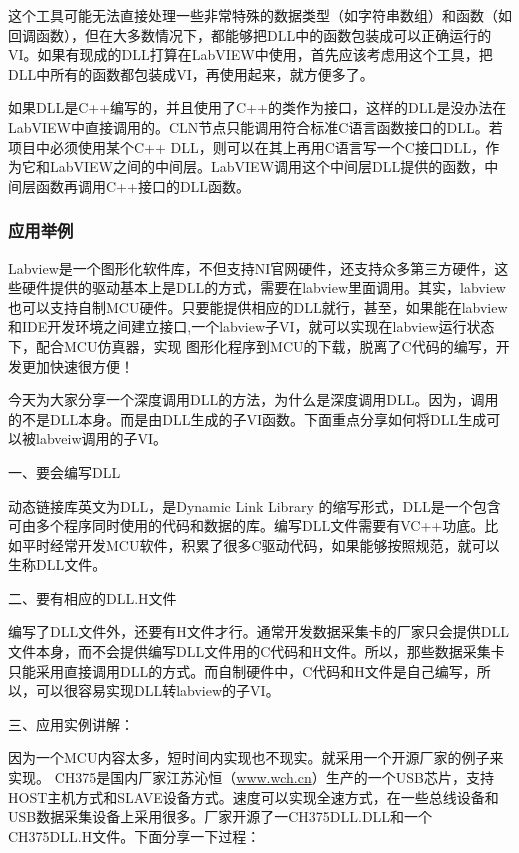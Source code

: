 这个工具可能无法直接处理一些非常特殊的数据类型（如字符串数组）和函数（如回调函数），但在大多数情况下，都能够把DLL中的函数包装成可以正确运行的VI。如果有现成的DLL打算在LabVIEW中使用，首先应该考虑用这个工具，把DLL中所有的函数都包装成VI，再使用起来，就方便多了。

如果DLL是C++编写的，并且使用了C++的类作为接口，这样的DLL是没办法在LabVIEW中直接调用的。CLN节点只能调用符合标准C语言函数接口的DLL。若项目中必须使用某个C++ DLL，则可以在其上再用C语言写一个C接口DLL，作为它和LabVIEW之间的中间层。LabVIEW调用这个中间层DLL提供的函数，中间层函数再调用C++接口的DLL函数。



\subsubsection{应用举例}
Labview是一个图形化软件库，不但支持NI官网硬件，还支持众多第三方硬件，这些硬件提供的驱动基本上是DLL的方式，需要在labview里面调用。其实，labview也可以支持自制MCU硬件。只要能提供相应的DLL就行，甚至，如果能在labview和IDE开发环境之间建立接口,一个labview子VI，就可以实现在labview运行状态下，配合MCU仿真器，实现  图形化程序到MCU的下载，脱离了C代码的编写，开发更加快速很方便！

     今天为大家分享一个深度调用DLL的方法，为什么是深度调用DLL。因为，调用的不是DLL本身。而是由DLL生成的子VI函数。下面重点分享如何将DLL生成可以被labveiw调用的子VI。


一、要会编写DLL

     动态链接库英文为DLL，是Dynamic Link Library 的缩写形式，DLL是一个包含可由多个程序同时使用的代码和数据的库。编写DLL文件需要有VC++功底。比如平时经常开发MCU软件，积累了很多C驱动代码，如果能够按照规范，就可以生称DLL文件。
     
     二、要有相应的DLL.H文件
     
     编写了DLL文件外，还要有H文件才行。通常开发数据采集卡的厂家只会提供DLL文件本身，而不会提供编写DLL文件用的C代码和H文件。所以，那些数据采集卡只能采用直接调用DLL的方式。而自制硬件中，C代码和H文件是自己编写，所以，可以很容易实现DLL转labview的子VI。


三、应用实例讲解：

     因为一个MCU内容太多，短时间内实现也不现实。就采用一个开源厂家的例子来实现。
CH375是国内厂家江苏沁恒（\url{www.wch.cn}）生产的一个USB芯片，支持HOST主机方式和SLAVE设备方式。速度可以实现全速方式，在一些总线设备和USB数据采集设备上采用很多。厂家开源了一CH375DLL.DLL和一个CH375DLL.H文件。下面分享一下过程：


